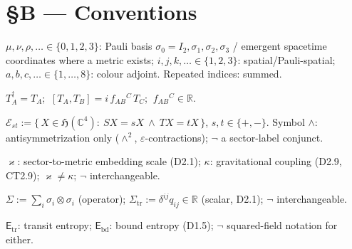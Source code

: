 \section[§B — Conventions]{\texorpdfstring{§B — Conventions}{SB - Conventions}}

\begin{convention}[{\texorpdfstring{C1}{C1}}]\label{tag:C1}
$\mu,\nu,\rho,\ldots\in\{0,1,2,3\}$: Pauli basis $\sigma_0=I_2,\sigma_1,\sigma_2,\sigma_3$ / emergent spacetime coordinates where a metric exists; $i,j,k,\ldots\in\{1,2,3\}$: spatial/Pauli-spatial; $a,b,c,\ldots\in\{1,\dots,8\}$: colour adjoint. Repeated indices: summed.

\end{convention}

\begin{convention}[{\texorpdfstring{C2}{C2}}]\label{tag:C2}
$T_A^\dagger=T_A$; $\ [T_A,T_B]=i\,f_{AB}{}^{C}\,T_C$; $\ f_{AB}{}^{C}\in\mathbb R$.

\end{convention}

\begin{convention}[{\texorpdfstring{C3}{C3}}]\label{tag:C3}
$\mathcal E_{st}:=\{\,X\in\mathfrak H(\mathbb C^4):\ SX=sX\ \wedge\ TX=tX\,\}$, $s,t\in\{+,-\}$. Symbol $\wedge$: antisymmetrization only ($\wedge^2$, $\varepsilon$-contractions); $\neg$ a sector-label conjunct.

\end{convention}

\begin{convention}[{\texorpdfstring{C4}{C4}}]\label{tag:C4}
$\varkappa$: sector-to-metric embedding scale (D2.1); $\kappa$: gravitational coupling (D2.9, CT2.9); $\varkappa\ne\kappa$; $\neg$ interchangeable.

\end{convention}

\begin{convention}[{\texorpdfstring{C5}{C5}}]\label{tag:C5}
$\Sigma:=\sum_i\sigma_i\otimes\sigma_i$ (operator); $\Sigma_{\mathrm{tr}}:=\delta^{ij}q_{ij}\in\mathbb R$ (scalar, D2.1); $\neg$ interchangeable.

\end{convention}

\begin{convention}[{\texorpdfstring{C6}{C6}}]\label{tag:C6}
$\mathsf E_{\mathrm{tr}}$: transit entropy; $\mathsf E_{\mathrm{bd}}$: bound entropy (D1.5); $\neg$ squared-field notation for either.

\end{convention}

